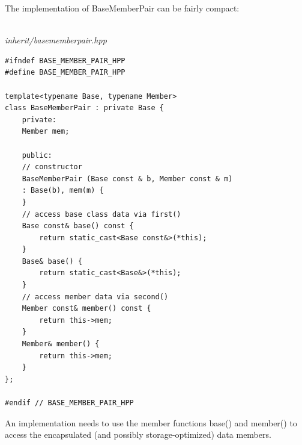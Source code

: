 The implementation of BaseMemberPair can be fairly compact:

\hspace*{\fill} \\ %
\noindent
\textit{inherit/basememberpair.hpp}
\begin{lstlisting}[style=styleCXX]
#ifndef BASE_MEMBER_PAIR_HPP
#define BASE_MEMBER_PAIR_HPP

template<typename Base, typename Member>
class BaseMemberPair : private Base {
	private:
	Member mem;
	
	public:
	// constructor
	BaseMemberPair (Base const & b, Member const & m)
	: Base(b), mem(m) {
	}
	// access base class data via first()
	Base const& base() const {
		return static_cast<Base const&>(*this);
	}
	Base& base() {
		return static_cast<Base&>(*this);
	}
	// access member data via second()
	Member const& member() const {
		return this->mem;
	}
	Member& member() {
		return this->mem;
	}
};

#endif // BASE_MEMBER_PAIR_HPP
\end{lstlisting}

An implementation needs to use the member functions base() and member() to access the encapsulated (and possibly storage-optimized) data members.





























